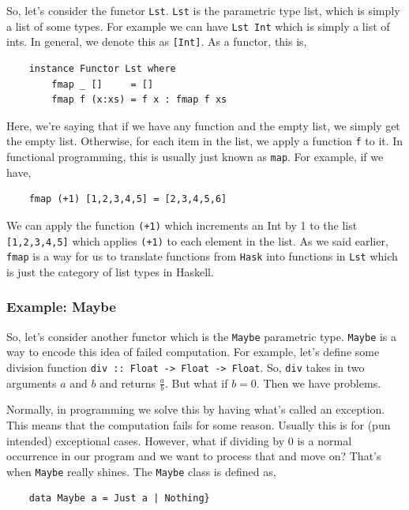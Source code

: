 So, let's consider the functor \lstinline{Lst}. \lstinline{Lst} is the parametric type list, which is simply a list of some types. For example we can have \lstinline{Lst Int} which is simply a list of ints. In general, we denote this as \lstinline{[Int]}. As a functor, this is,
\begin{lstlisting}
    instance Functor Lst where
        fmap _ []     = []
        fmap f (x:xs) = f x : fmap f xs
\end{lstlisting}

Here, we're saying that if we have any function and the empty list, we simply get the empty list. Otherwise, for each item in the list, we apply a function \lstinline{f} to it. In functional programming, this is usually just known as \lstinline{map}. For example, if we have,
\begin{lstlisting}
    fmap (+1) [1,2,3,4,5] = [2,3,4,5,6]
\end{lstlisting}

We can apply the function \lstinline{(+1)} which increments an Int by 1 to the list \lstinline{[1,2,3,4,5]} which applies \lstinline{(+1)} to each element in the list. As we said earlier, \lstinline{fmap} is a way for us to translate functions from \lstinline{Hask} into functions in \lstinline{Lst} which is just the category of list types in Haskell.

\subsubsection{Example: Maybe}

So, let's consider another functor which is the \lstinline{Maybe} parametric type. \lstinline{Maybe} is a way to encode this idea of failed computation. For example, let's define some division function \lstinline{div :: Float -> Float -> Float}. So, \lstinline{div} takes in two arguments $a$ and $b$ and returns $\frac{a}{b}$. But what if $b = 0$. Then we have problems. 

Normally, in programming we solve this by having what's called an exception. This means that the computation fails for some reason. Usually this is for (pun intended) exceptional cases. However, what if dividing by 0 is a normal occurrence in our program and we want to process that and move on? That's when \lstinline{Maybe} really shines. The \lstinline{Maybe} class is defined as,

\begin{lstlisting}
    data Maybe a = Just a | Nothing} 
\end{lstlisting}

